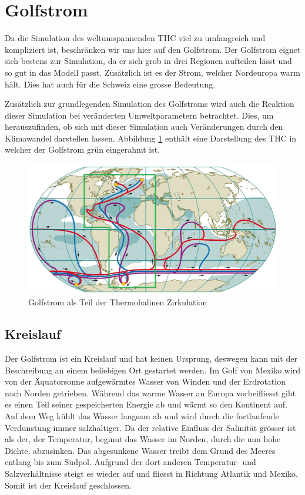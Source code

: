\section{Golfstrom}

Da die Simulation des weltumspannenden THC viel zu umfangreich und kompliziert ist, beschränken wir uns hier auf den Golfstrom.
Der Golfstrom eignet sich bestens zur Simulation, da er sich grob in drei Regionen aufteilen lässt und so gut in das Modell passt. Zusätzlich ist es der Strom, welcher Nordeuropa warm hält. Dies hat auch für die Schweiz eine grosse Bedeutung.

Zusätzlich zur grundlegenden Simulation des Golfstroms wird auch die Reaktion dieser Simulation bei veränderten Umweltparametern betrachtet. Dies, um herauszufinden, ob sich mit dieser Simulation auch Veränderungen durch den Klimawandel darstellen lassen. Abbildung \ref{thermohalin:Deep-Ocean-Currents} enthält eine Darstellung des THC in welcher der Golfstrom grün eingerahmt ist. 

\begin{figure}
	\includegraphics[width=12cm]{thermohalin/Bilder/Deep-Ocean-Currents2.jpg}
	\centering
	\caption{Golfstrom als Teil der Thermohalinen Zirkulation\label{thermohalin:Deep-Ocean-Currents}}
\end{figure}



\subsection{Kreislauf}

Der Golfstrom ist ein Kreislauf und hat keinen Ursprung, deswegen kann mit der Beschreibung an einem beliebigen Ort gestartet werden. Im Golf von Mexiko wird von der Äquatorsonne aufgewärmtes Wasser von Winden und der Erdrotation nach Norden getrieben. Während das warme Wasser an Europa vorbeifliesst gibt es einen Teil seiner gespeicherten Energie ab und wärmt so den Kontinent auf.
Auf dem Weg kühlt das Wasser langsam ab und wird durch die fortlaufende Verdunstung immer salzhaltiger. Da der relative Einfluss der Salinität grösser ist als der, der Temperatur, beginnt das Wasser im Norden, durch die nun hohe Dichte, abzusinken. Das abgesunkene Wasser treibt dem Grund des Meeres entlang bis zum Südpol. Aufgrund der dort anderen Temperatur- und Salzverhältnisse steigt es wieder auf und fliesst in Richtung Atlantik und Mexiko. Somit ist der Kreislauf geschlossen.

